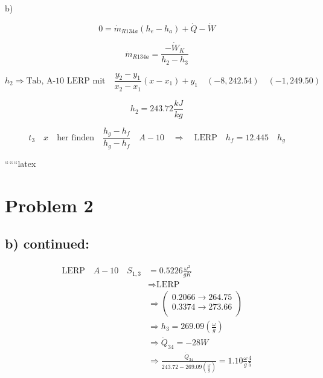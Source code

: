 b)

\[
0 = \dot{m}_{R134a} (h_{e} - h_{a}) + \dot{Q} - \dot{W}
\]

\[
\dot{m}_{R134a} = \frac{-\dot{W}_{K}}{h_{2} - h_{3}}
\]

\[
h_{2} \Rightarrow \text{Tab, A-10 LERP mit} \quad \frac{y_{2} - y_{1}}{x_{2} - x_{1}} (x - x_{1}) + y_{1} \quad \left( -8, 242.54 \right) \quad \left( -1, 249.50 \right)
\]

\[
h_{2} = 243.72 \frac{kJ}{kg}
\]

\[
t_{3} \quad x \quad \text{her finden} \quad \frac{h_{g} - h_{f}}{h_{g} - h_{f}} \quad A-10 \quad \Rightarrow \quad \text{LERP} \quad h_{f} = 12.445 \quad h_{g}
\]

``````latex


\section*{Problem 2}

\subsection*{b) continued:}

\begin{align*}
\text{LERP} \quad A-10 \quad S_{1,3} &= 0.5226 \frac{\omega^2}{gK} \\
&\Rightarrow \text{LERP} \\
&\Rightarrow \left( \begin{array}{c}
0.2066 \rightarrow 264.75 \\
0.3374 \rightarrow 273.66 \\
\end{array} \right) \\
&\Rightarrow h_3 = 269.09 \left( \frac{\omega}{g} \right) \\
&\Rightarrow \dot{Q}_{34} = -28W \\
&\Rightarrow \frac{\dot{Q}_{34}}{243.72 - 269.09 \left( \frac{\omega}{g} \right)} = 1.10 \frac{\omega}{g} \frac{4}{5}
\end{align*}